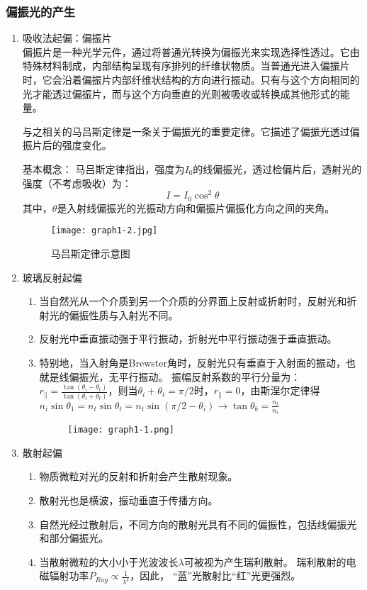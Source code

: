 \documentclass[dvipsnames, svgnames,a4paper,11pt]{article}
\begin{document}
\subsubsection{偏振光的产生}
\begin{enumerate}
	\item 吸收法起偏：偏振片\\
	偏振片是一种光学元件，通过将普通光转换为偏振光来实现选择性透过。它由特殊材料制成，内部结构呈现有序排列的纤维状物质。当普通光进入偏振片时，它会沿着偏振片内部纤维状结构的方向进行振动。只有与这个方向相同的光才能透过偏振片，而与这个方向垂直的光则被吸收或转换成其他形式的能量。
	
	与之相关的马吕斯定律是一条关于偏振光的重要定律。它描述了偏振光透过偏振片后的强度变化。

	基本概念：
	马吕斯定律指出，强度为$I_0$​的线偏振光，透过检偏片后，透射光的强度（不考虑吸收）为：
	\[ I = I_0 \cos^2 \theta \]
	其中，$\theta$是入射线偏振光的光振动方向和偏振片偏振化方向之间的夹角。

		\begin{figure}[htbp]
			\centering
			\texttt{[image: graph1-2.jpg]}
			\caption{马吕斯定律示意图}
			\label{fig:graph1-2}
		\end{figure}
	
	\item 玻璃反射起偏
		\begin{enumerate}[label=\roman*.]
			\item 当自然光从一个介质到另一个介质的分界面上反射或折射时，反射光和折射光的偏振性质与入射光不同。
			\item 反射光中垂直振动强于平行振动，折射光中平行振动强于垂直振动。
			\item 特别地，当入射角是Brewster角时，反射光只有垂直于入射面的振动，也就是线偏振光，无平行振动。
				振幅反射系数的平行分量为：$r_\parallel =\frac{\tan(\theta_i-\theta_t)}{\tan(\theta_i+\theta_t)}$，则当$\theta_i+\theta_t=\pi/2$时，$r_\parallel=0$，由斯涅尔定律得$n_i\sin\theta_1=n_t\sin\theta_t=n_t\sin(\pi/2-\theta_i)\longrightarrow\tan\theta_b=\frac{n_t}{n_i}$
				
				\begin{figure}[htbp]
					\centering
					\texttt{[image: graph1-1.png]}
					\label{fig:graph1-1}
				\end{figure}


		\end{enumerate}
	\item 散射起偏
		\begin{enumerate}[label=\roman*.]
			\item 物质微粒对光的反射和折射会产生散射现象。
			\item 散射光也是横波，振动垂直于传播方向。
			\item 自然光经过散射后，不同方向的散射光具有不同的偏振性，包括线偏振光和部分偏振光。
			\item 当散射微粒的大小小于光波波长$\lambda$可被视为产生瑞利散射。
			瑞利散射的电磁辐射功率$P_{Ray}\propto\frac{1}{\lambda^4}$，因此， “蓝”光散射比“红”光更强烈。
		\end{enumerate}
\end{enumerate}
\end{document}
